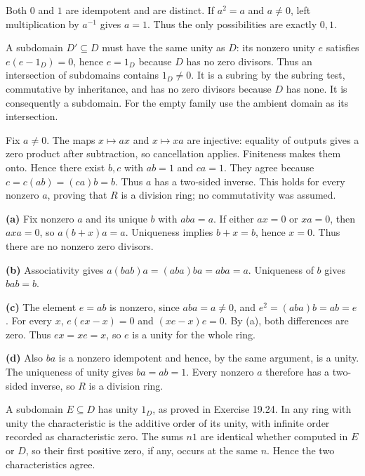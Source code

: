 Both $0$ and $1$ are idempotent and are distinct. If $a^2=a$ and $a\ne0$, left multiplication by $a^{-1}$ gives $a=1$. Thus the only possibilities are exactly $\boxed{0,1}$.

A subdomain $D'\subseteq D$ must have the same unity as $D$: its nonzero unity $e$ satisfies $e(e-1_D)=0$, hence $e=1_D$ because $D$ has no zero divisors. Thus an intersection of subdomains contains $1_D\ne0$. It is a subring by the subring test, commutative by inheritance, and has no zero divisors because $D$ has none. It is consequently a subdomain. For the empty family use the ambient domain as its intersection.

Fix $a\ne0$. The maps $x\mapsto ax$ and $x\mapsto xa$ are injective: equality of outputs gives a zero product after subtraction, so cancellation applies. Finiteness makes them onto. Hence there exist $b,c$ with $ab=1$ and $ca=1$. They agree because $c=c(ab)=(ca)b=b$. Thus $a$ has a two-sided inverse. This holds for every nonzero $a$, proving that $R$ is a division ring; no commutativity was assumed.

\textbf{(a)} Fix nonzero $a$ and its unique $b$ with $aba=a$. If either $ax=0$ or $xa=0$, then $axa=0$, so $a(b+x)a=a$. Uniqueness implies $b+x=b$, hence $x=0$. Thus there are no nonzero zero divisors.\par
\textbf{(b)} Associativity gives $a(bab)a=(aba)ba=aba=a$. Uniqueness of $b$ gives $bab=b$.\par
\textbf{(c)} The element $e=ab$ is nonzero, since $aba=a\ne0$, and $e^2=(aba)b=ab=e$. For every $x$, $e(ex-x)=0$ and $(xe-x)e=0$. By (a), both differences are zero. Thus $ex=xe=x$, so $e$ is a unity for the whole ring.\par
\textbf{(d)} Also $ba$ is a nonzero idempotent and hence, by the same argument, is a unity. The uniqueness of unity gives $ba=ab=1$. Every nonzero $a$ therefore has a two-sided inverse, so $R$ is a division ring.

A subdomain $E\subseteq D$ has unity $1_D$, as proved in Exercise 19.24. In any ring with unity the characteristic is the additive order of its unity, with infinite order recorded as characteristic zero. The sums $n1$ are identical whether computed in $E$ or $D$, so their first positive zero, if any, occurs at the same $n$. Hence the two characteristics agree.

